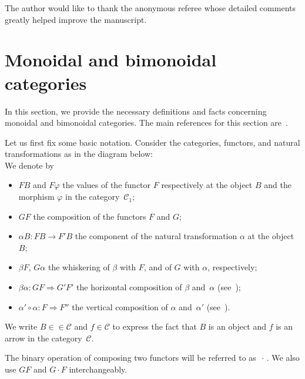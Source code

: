 \documentclass[10pt]{simplearticle}
\newcommand{\tikzinput}[1]{}
\newcommand{\singledot}{\,\cdot\,}
\begin{document}
\begin{acknowledgement}
The author would like to thank the anonymous referee whose detailed
comments greatly helped improve the manuscript.
\end{acknowledgement}

\section{\label{sec:moncats}Monoidal and bimonoidal categories}

In this section, we provide the necessary definitions and facts concerning
monoidal and bimonoidal categories. The main references for this section
are~\cite{JY_bimon24,JY2021,mclane-categories}.

Let us first fix some basic notation. Consider the categories, functors,
and natural transformations as in the diagram below:
\[
\tikzinput{d582}
\]
We denote by
\begin{itemize}
\item $FB$ and $F\varphi$ the values of the functor $F$ respectively
at the object $B$ and the morphism $\varphi$ in the category~$\mathcal{C}_{1}$;
\item $GF$ the composition of the functors $F$ and $G$;
\item $\alpha B\colon FB\to F'B$ the component of the natural transformation
$\alpha$ at the object~$B$;
\item $\beta F$, $G\alpha$ the whiskering of $\beta$ with $F$, and of
$G$ with $\alpha$, respectively;
\item $\beta\alpha\colon GF\Rightarrow G'F'$ the horizontal composition
of $\beta$ and~$\alpha$ (see~\cite[II.5 and~XII.3]{mclane-categories});
\item $\alpha'\circ\alpha\colon F\Rightarrow F''$ the vertical composition
of $\alpha$ and~$\alpha'$ (see~\cite[II.5 and~XII.3]{mclane-categories}).
\end{itemize}
We write $B\in\in\mathcal{C}$ and $f\in\mathcal{C}$ to express the
fact that $B$ is an object and $f$ is an arrow in the category~$\mathcal{C}$.
\begin{rem}
The binary operation of composing two functors will be referred to
as $\singledot$. We also use $GF$ and $G\cdot F$ interchangeably.
\end{rem}
\end{document}
